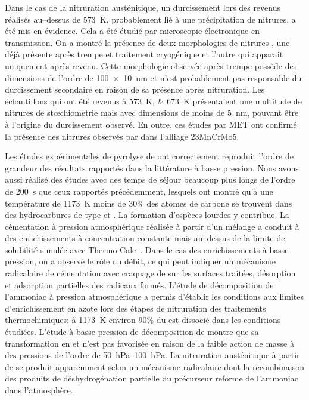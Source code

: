 Dans le cas de la nitruration austénitique, un durcissement lors des revenus réalisés au--dessus de \SI{573}{\kelvin}, probablement lié à une précipitation de nitrures, a été mis en évidence. Cela a été étudié par microscopie électronique en transmission. On a montré la présence de deux morphologies de nitrures , une déjà présente après trempe et traitement cryogénique et l'autre qui apparait uniquement après revenu. Cette morphologie observée après trempe possède des dimensions de l'ordre de \SI{100 x 10}{\nano\metre} et n'est probablement pas responsable du durcissement secondaire en raison de sa présence après nitruration. Les échantillons qui ont été revenus à \SIlist{573;673}{\kelvin} présentaient une multitude de nitrures de st{\oe}chiometrie  mais avec dimensions de moins de \SI{5}{\nano\metre}, pouvant être à l'origine du durcissement observé. En outre, ces études par MET ont confirmé la présence des nitrures  observés par \citet{Catteau2016} dans l'alliage 23MnCrMo5.

Les études expérimentales de pyrolyse de  ont correctement reproduit l'ordre de grandeur des résultats rapportés dans la littérature à basse pression. Nous avons aussi réalisé des études avec des temps de séjour beaucoup plus longs \textendash{} de l'ordre de \SI{200}{\second} \textendash{} que ceux rapportés précédemment, lesquels ont montré qu'à une température de \SI{1173}{\kelvin} moins de 30\% des atomes de carbone se trouvent dans des hydrocarbures de type  et . La formation d'espèces lourdes y contribue. La cémentation à pression atmosphérique réalisée à partir d'un mélange  a conduit à des enrichissements à concentration constante mais au--dessus de la limite de solubilité simulée avec Thermo-Calc~\cite{Andersson2002,Borgenstam2000}. Dans le cas des enrichissements à basse pression, on a observé le rôle du débit, ce qui peut indiquer un mécanisme radicalaire de cémentation avec craquage de  sur les surfaces traitées, désorption et adsorption partielles des radicaux formés. L'étude de décomposition de l'ammoniac à pression atmosphérique a permis d'établir les conditions aux limites d'enrichissement en azote lors des étapes de nitruration des traitements thermochimiques: à \SI{1173}{\kelvin} environ 90\% du  est dissocié dans les conditions étudiées. L'étude à basse pression de décomposition de  montre que sa transformation en  et  n'est pas favorisée en raison de la faible action de masse à des pressions de l'ordre de \SIrange{50}{100}{\hecto\pascal}. La nitruration austénitique à partir de  se produit apparemment selon un mécanisme radicalaire dont la recombinaison des produits de déshydrogénation partielle du précurseur reforme de l'ammoniac dans l'atmosphère.

